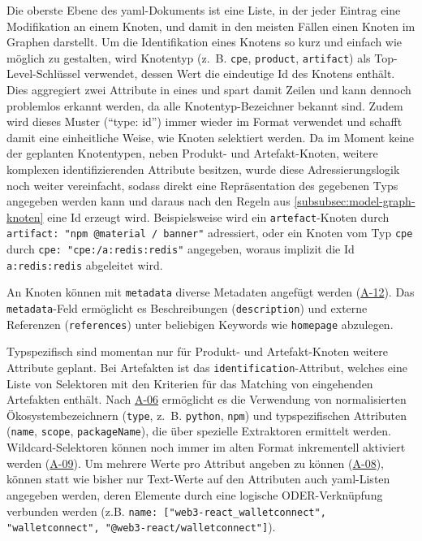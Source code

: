 Die oberste Ebene des \acrshort{yaml}-Dokuments ist eine Liste, in der jeder Eintrag eine Modifikation an einem Knoten, und damit in den meisten Fällen einen Knoten im Graphen darstellt.
Um die Identifikation eines Knotens so kurz und einfach wie möglich zu gestalten, wird Knotentyp (z.\ B. \texttt{cpe}, \texttt{product}, \texttt{artifact}) als Top-Level-Schlüssel verwendet, dessen Wert die eindeutige Id des Knotens enthält.
Dies aggregiert zwei Attribute in eines und spart damit Zeilen und kann dennoch problemlos erkannt werden, da alle Knotentyp-Bezeichner bekannt sind.
Zudem wird dieses Muster (\enquote{type: id}) immer wieder im Format verwendet und schafft damit eine einheitliche Weise, wie Knoten selektiert werden.
Da im Moment keine der geplanten Knotentypen, neben Produkt- und Artefakt-Knoten, weitere komplexen identifizierenden Attribute besitzen, wurde diese Adressierungslogik noch weiter vereinfacht, sodass direkt eine Repräsentation des gegebenen Typs angegeben werden kann und daraus nach den Regeln aus \autoref{subsubsec:model-graph-knoten} eine Id erzeugt wird.
Beispielsweise wird ein \texttt{artefact}-Knoten durch \texttt{artifact: "npm @material / banner"} adressiert, oder ein Knoten vom Typ \texttt{cpe} durch \texttt{cpe: "cpe:/a:redis:redis"} angegeben, woraus implizit die Id \texttt{a:redis:redis} abgeleitet wird.

An Knoten können mit \texttt{metadata} diverse Metadaten angefügt werden (\hyperref[subsec:req-reason-format]{A-12}).
Das \texttt{metadata}-Feld ermöglicht es Beschreibungen (\texttt{description}) und externe Referenzen (\texttt{references}) unter beliebigen Keywords wie \texttt{homepage} abzulegen.

Typspezifisch sind momentan nur für Produkt- und Artefakt-Knoten weitere Attribute geplant.
Bei Artefakten ist das \texttt{identification}-Attribut, welches eine Liste von Selektoren mit den Kriterien für das Matching von eingehenden Artefakten enthält.
Nach \hyperref[subsec:req-type-specific-matching]{A-06} ermöglicht es die Verwendung von normalisierten Ökosystembezeichnern (\texttt{type}, z.\ B. \texttt{python}, \texttt{npm}) und typspezifischen Attributen (\texttt{name}, \texttt{scope}, \texttt{packageName}), die über spezielle Extraktoren ermittelt werden.
Wildcard-Selektoren können noch immer im alten Format inkrementell aktiviert werden (\hyperref[subsec:req-regex-support]{A-09}).
Um mehrere Werte pro Attribut angeben zu können (\hyperref[subsec:req-multiple-attribute-values]{A-08}), können statt wie bisher nur Text-Werte auf den Attributen auch \acrshort{yaml}-Listen angegeben werden, deren Elemente durch eine logische ODER-Verknüpfung verbunden werden (z.B. \texttt{name: ["web3-react\_walletconnect", "walletconnect", "@web3-react/walletconnect"]}).

